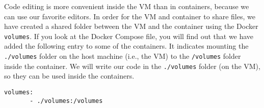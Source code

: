 Code editing is more convenient inside the VM than in containers, 
because we can use our favorite editors.
In order for the VM and container to share files, 
we have created a shared folder between the VM and the container
using the Docker \texttt{volumes}.
If you look at the Docker Compose file, you will find out that
we have added the following entry to some of the containers.
It indicates mounting the \texttt{./volumes} folder on the host
machine (i.e., the VM) to the \texttt{/volumes} folder inside the container.
We will write our code in the \texttt{./volumes} folder (on the VM), so they
can be used inside the containers.

\begin{lstlisting}
volumes:
       - ./volumes:/volumes
\end{lstlisting}

